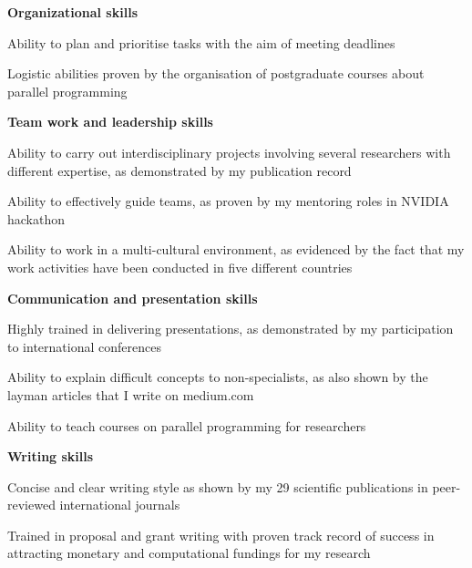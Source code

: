 \documentclass[a4paper,10pt,final]{memoir}
\newcommand{\Sep}{\vspace{0.8cm}}
\newcommand{\CVItem}[1]
	{\textbf{\color{RoyalBlue} #1}}
\begin{document}
\CVItem{Organizational skills}
\begin{compactitem}[\color{RoyalBlue}$\circ$]
\item Ability to plan and prioritise tasks with the aim of meeting deadlines
\item Logistic abilities proven by the organisation of postgraduate courses about parallel programming
\end{compactitem}
\Sep

\CVItem{Team work and leadership skills}
\begin{compactitem}[\color{RoyalBlue}$\circ$]
\item Ability to carry out interdisciplinary projects involving several researchers with different expertise, as demonstrated by my publication record
\item Ability to effectively guide teams, as proven by my mentoring roles in NVIDIA hackathon
\item Ability to work in a multi-cultural environment, as evidenced by the fact that my work activities have been conducted in five different countries
\end{compactitem}
\Sep

\CVItem{Communication and presentation skills}
\begin{compactitem}[\color{RoyalBlue}$\circ$]
\item Highly trained in delivering presentations, as demonstrated by my participation to international conferences
\item Ability to explain difficult concepts to non-specialists, as also shown by the layman articles that I write on medium.com
\item Ability to teach courses on parallel programming for researchers
\end{compactitem}
\Sep

\CVItem{Writing skills}
\begin{compactitem}[\color{RoyalBlue}$\circ$]
\item Concise and clear writing style as shown by my 29 scientific publications in peer-reviewed international journals
\item Trained in proposal and grant writing with proven track record of success in attracting monetary and computational fundings for my research 
\end{compactitem}
\Sep
\end{document}
